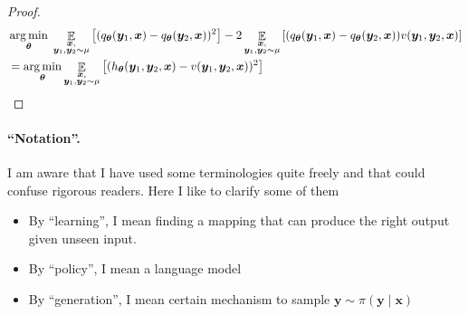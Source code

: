 \documentclass[11pt,a4paper]{article}
\begin{document}
\begin{proof}
\begin{align*}
&\operatorname*{arg\,min}_{\boldsymbol \theta} \; \mathop{\mathbb{E}}_{\substack{\bm{x}, \\ \bm{y}_1, \bm{y}_2 \sim \mu}} \left[ (q_{\boldsymbol \theta}(\bm{y}_1, \bm{x}) - q_{\boldsymbol \theta}(\bm{y}_2, \bm{x}))^2 \right] - 2 \mathop{\mathbb{E}}_{\substack{\bm{x}, \\ \bm{y}_1, \bm{y}_2 \sim \mu}} \left[ (q_{\boldsymbol \theta}(\bm{y}_1, \bm{x}) - q_{\boldsymbol \theta}(\bm{y}_2, \bm{x})) v(\bm{y}_1, \bm{y}_2, \bm{x}) \right] \\
&=\operatorname*{arg\,min}_{\boldsymbol \theta} \mathop{\mathbb{E}}_{\substack{\bm{x}, \\ \bm{y}_1, \bm{y}_2 \sim \mu}} \left[ ( h_{\boldsymbol \theta}(\bm{y}_1, \bm{y}_2, \bm{x}) - v(\bm{y}_1, \bm{y}_2, \bm{x}))^2 \right]
\end{align*} 
\end{proof}

\paragraph{``Notation''.} 
I am aware that I have used some terminologies quite freely and that could confuse rigorous readers. Here I like to clarify some of them
\begin{itemize}
    \item By ``learning'', I mean finding a mapping that can produce the right output given unseen input.
    \item By ``policy'', I mean a language model
    \item By ``generation'', I mean certain mechanism to sample $\bm{y} \sim \pi(\bm{y}\mid \bm{x})$
\end{itemize}
\end{document}
